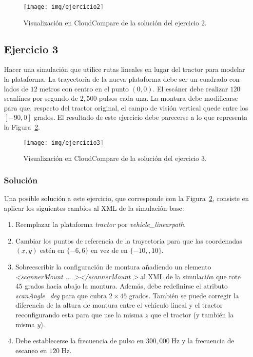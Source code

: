 \documentclass[]{article}
\begin{document}
	\begin{figure}[htb]
		\centering
		\texttt{[image: img/ejercicio2]}
		\caption{Visualización en CloudCompare de la solución del ejercicio 2.}
		\label{fig:ejercicio2}
	\end{figure} 

	
	\pagebreak


	\subsection*{Ejercicio 3}
	Hacer una simulación que utilice rutas lineales en lugar del tractor para modelar la plataforma. La trayectoria de la nueva plataforma debe ser un cuadrado con lados de $12$ metros con centro en el punto $(0, 0)$. El escáner debe realizar $120$ scanlines por segundo de $2,500$ pulsos cada una. La montura debe modificarse para que, respecto del tractor original, el campo de visión vertical quede entre los $[-90, 0]$ grados. El resultado de este ejercicio debe parecerse a lo que representa la Figura~\ref{fig:ejercicio3}.
	
	\begin{figure}[htb]
		\centering
		\texttt{[image: img/ejercicio3]}
		\caption{Visualización en CloudCompare de la solución del ejercicio 3.}
		\label{fig:ejercicio3}
	\end{figure} 

	\subsubsection*{Solución}
	Una posible solución a este ejercicio, que corresponde con la Figura~\ref{fig:ejercicio3}, consiste en aplicar los siguientes cambios al XML de la simulación base:
	
	\begin{enumerate}
		\item Reemplazar la plataforma \textit{tractor} por \textit{vehicle\_linearpath}.
		\item Cambiar los puntos de referencia de la trayectoria para que las coordenadas $(x, y)$ estén en $\{-6, 6\}$ en vez de en $\{-10, ,10\}$.
		\item Sobreescribir la configuración de montura añadiendo un elemento \textit{\textless scannerMount ... \textgreater \textless /scannerMount \textgreater} al XML de la simulación que rote $45$ grados hacia abajo la montura. Además, debe redefinirse el atributo \textit{scanAngle\_deg} para que cubra $2 \times 45$ grados. También se puede corregir la diferencia de la altura de montura entre el vehículo lineal y el tractor reconfigurando esta para que use la misma $z$ que el tractor (y también la misma $y$).
		\item Debe establecerse la frecuencia de pulso en $300,000\;\text{Hz}$ y la frecuencia de escaneo en $120\;\text{Hz}$.
	\end{enumerate}
\end{document}
